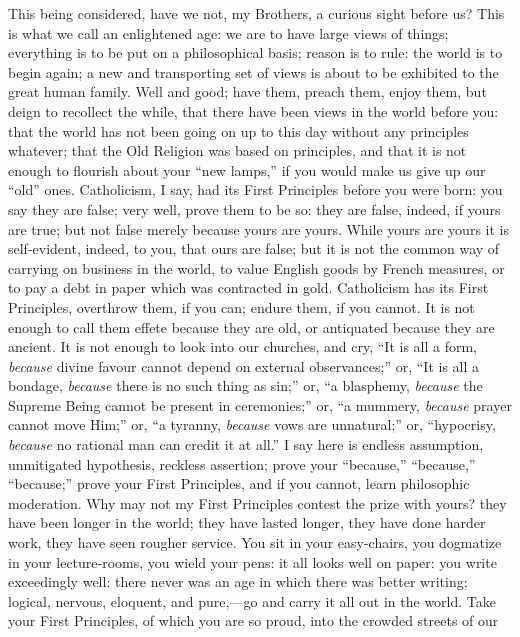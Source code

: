 This being considered, have we not, my Brothers, a
curious sight before us? This is what we call an
enlightened age: we are to have large views of things;
everything is to be put on a philosophical basis; reason
is to rule: the world is to begin again; a new and
transporting set of views is about to be exhibited to the
great human family. Well and good; have them, preach
them, enjoy them, but deign to recollect the while, that
there have been views in the world before you: that the
world has not been going on up to this day without any
principles whatever; that the Old Religion was based on
principles, and that it is not enough to flourish about
your ``new lamps,'' if you would make us give up
our ``old'' ones. Catholicism, I say, had its
First Principles before you were born: you say they are
false; very well, prove them to be so: they are false,
indeed, if yours are true; but not false merely because
yours are yours. While yours are yours it is
self-evident, indeed, to you, that ours are false; but it
is not the common way of carrying on business in the
world, to value English goods by French measures, or to
pay a debt in paper which was contracted in gold.
Catholicism has its First Principles, overthrow them, if
you can; endure them, if you cannot. It is not enough to
call them effete because they are old, or antiquated
because they are ancient. It is not enough to look into
our churches, and cry, ``It is all a form, \emph{because}
divine favour cannot depend on external
observances;'' or, ``It is all a bondage, \emph{because}
there is no such thing as sin;'' or, ``a
blasphemy, \emph{because} the Supreme Being cannot be present in
ceremonies;'' or, ``a mummery, \emph{because}
prayer cannot move Him;'' or, ``a tyranny, \emph{because}
vows are unnatural;'' or, ``hypocrisy, \emph{because}
no rational man can credit it at all.'' I say here is
endless assumption, unmitigated hypothesis, reckless
assertion; prove your ``because,''
``because,'' ``because;'' prove your
First Principles, and if you cannot, learn philosophic
moderation. Why may not my First Principles contest the
prize with yours? they have been longer in the world;
they have lasted longer, they have done harder work, they
have seen rougher service. You sit in your easy-chairs,
you dogmatize in your lecture-rooms, you wield your pens:
it all looks well on paper: you write exceedingly well:
there never was an age in which there was better writing;
logical, nervous, eloquent, and pure,—go and carry it all out in the world. Take your First Principles, of
which you are so proud, into the crowded streets of our
